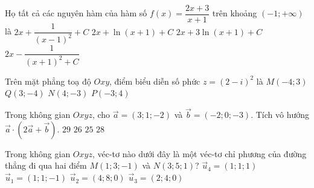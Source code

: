 \begin{ex}%
Họ tất cả các nguyên hàm của hàm số $f(x)=\dfrac{2x+3}{x+1}$ trên khoảng $(-1;+\infty)$ là	
	\choice
	{$2x+\dfrac{1}{(x-1)^2}+C$}
	{\True $2x+\ln (x+1)+C$}
	{$2x+3\ln(x+1)+C$}
	{$2x-\dfrac{1}{(x+1)^2+C}$}
\end{ex}

\begin{ex}%
	Trên mặt phẳng toạ độ $Oxy$, điểm biểu diễn số phức $z=(2-i)^2$  là
	\choice
	{$M(-4;3)$}
	{\True $Q(3;-4)$}
	{$N(4;-3)$}
	{$P(-3;4)$}
\end{ex}

\begin{ex}%
	Trong không gian $Oxyz$, cho $\overrightarrow{a}=(3;1;-2)$ và $\overrightarrow{b}=(-2;0;-3)$. Tích vô hướng $\overrightarrow{a}\cdot \left( 2\overrightarrow{a}+\overrightarrow{b}\right) $.
	\choice
	{$29$}
	{$26$}
	{$25$}
	{\True $28$}
\end{ex}

\begin{ex}%
	Trong không gian $Oxyz$, véc-tơ nào dưới đây là một véc-tơ chỉ phương của đường thẳng đi qua hai điểm $M(1;3;-1)$ và $N(3;5;1)$?
	\choice
	{\True $\overrightarrow{u}_4=(1;1;1)$}
	{$\overrightarrow{u}_1=(1;1;-1)$}
	{$\overrightarrow{u}_2=(4;8;0)$}
	{$\overrightarrow{u}_3=(2;4;0)$}
\end{ex}

